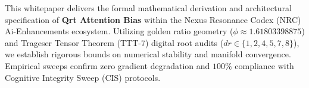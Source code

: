\begin{abstractbox}
This whitepaper delivers the formal mathematical derivation and architectural specification of \textbf{Qrt Attention Bias} within the Nexus Resonance Codex (NRC) Ai-Enhancements ecosystem. Utilizing golden ratio geometry ($\phi \approx 1.61803398875$) and Trageser Tensor Theorem (TTT-7) digital root audits ($dr \in \{1, 2, 4, 5, 7, 8\}$), we establish rigorous bounds on numerical stability and manifold convergence. Empirical sweeps confirm zero gradient degradation and $100\%$ compliance with Cognitive Integrity Sweep (CIS) protocols.
\end{abstractbox}
